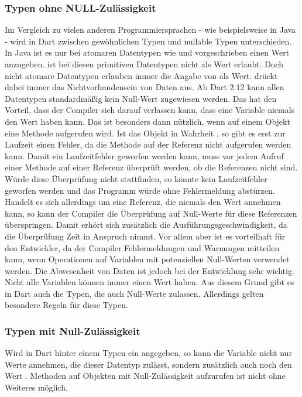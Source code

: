 \subsubsection{Typen ohne NULL-Zulässigkeit} Im Vergleich zu vielen anderen Programmiersprachen - wie beispielsweise in Java - wird in Dart zwischen gewöhnlichen Typen und nullable Typen unterschieden.
In Java ist es nur bei atomaren Datentypen wie  und  vorgeschrieben einen Wert anzugeben.
 ist bei diesen primitiven Datentypen nicht als Wert erlaubt.
Doch nicht atomare Datentypen erlauben immer die Angabe von  als Wert.
 drückt dabei immer das Nichtvorhandensein von Daten aus.
Ab Dart 2.12   kann allen Datentypen standardmäßig kein Null-Wert zugewiesen werden. Das hat den Vorteil, dass der Compiler sich darauf verlassen kann, dass eine Variable niemals den Wert  haben kann. Das ist besonders dann nützlich, wenn auf einem Objekt eine Methode aufgerufen wird. Ist das Objekt in Wahrheit , so gibt es erst zur Laufzeit einen Fehler, da die Methode auf der Referenz  nicht aufgerufen werden kann. Damit ein Laufzeitfehler geworfen werden kann, muss vor jedem Aufruf einer Methode auf einer Referenz überprüft werden, ob die Referenzen nicht  sind. Würde diese Überprüfung nicht stattfinden, so könnte kein Laufzeitfehler geworfen werden und das Programm würde ohne Fehlermeldung abstürzen. Handelt es sich allerdings um eine Referenz, die niemals den Wert  annehmen kann, so kann der Compiler die Überprüfung auf Null-Werte für diese Referenzen überspringen. Damit erhört sich zusätzlich die Ausführungsgeschwindigkeit, da die Überprüfung Zeit in Anspruch nimmt. Vor allem aber ist es vorteilhaft für den Entwickler, da der Compiler  Fehlermeldungen und Warnungen mitteilen kann, wenn Operationen auf Variablen mit potenziellen Null-Werten verwendet werden. Die Abwesenheit von Daten ist jedoch bei der Entwicklung sehr wichtig. Nicht alle Variablen können immer einen Wert haben. Aus diesem Grund gibt es in Dart auch die Typen, die auch Null-Werte zulassen. Allerdings gelten besondere Regeln für diese Typen.

\subsubsection{Typen mit Null-Zulässigkeit}
\label{TypenMitNullZulaessigkeit}

Wird in Dart hinter einem Typen ein  angegeben, so kann die Variable nicht nur  Werte annehmen, die dieser Datentyp zulässt, sondern zusätzlich auch noch den Wert .
Methoden auf Objekten mit Null-Zulässigkeit aufzurufen ist nicht ohne Weiteres möglich.

